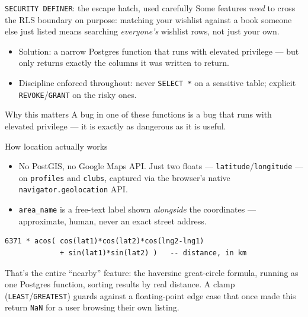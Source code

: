 \documentclass[aspectratio=169,11pt]{beamer}
\newcommand{\code}[1]{\textcolor{olkTealDark}{\texttt{#1}}}
\begin{document}
\begin{frame}[fragile]{\code{SECURITY DEFINER}: the escape hatch, used carefully}
  Some features \emph{need} to cross the RLS boundary on purpose: matching your wishlist against a book someone else just listed means searching \emph{everyone's} wishlist rows, not just your own.
  \begin{itemize}
    \item Solution: a narrow Postgres function that runs with elevated privilege --- but only returns exactly the columns it was written to return.
    \item Discipline enforced throughout: never \code{SELECT *} on a sensitive table; explicit \code{REVOKE}/\code{GRANT} on the risky ones.
  \end{itemize}
  \vfill
  \begin{alertblock}{Why this matters}
    A bug in one of these functions is a bug that runs with elevated privilege --- it is exactly as dangerous as it is useful.
  \end{alertblock}
\end{frame}

\begin{frame}[fragile]{How location actually works}
  \begin{itemize}
    \item No PostGIS, no Google Maps API. Just two floats --- \code{latitude}/\code{longitude} --- on \code{profiles} and \code{clubs}, captured via the browser's native \code{navigator.geolocation} API.
    \item \code{area\_name} is a free-text label shown \emph{alongside} the coordinates --- approximate, human, never an exact street address.
  \end{itemize}
  \begin{lstlisting}
6371 * acos( cos(lat1)*cos(lat2)*cos(lng2-lng1)
             + sin(lat1)*sin(lat2) )   -- distance, in km
  \end{lstlisting}
  \small That's the entire ``nearby'' feature: the haversine great-circle formula, running as one Postgres function, sorting results by real distance. A clamp (\code{LEAST}/\code{GREATEST}) guards against a floating-point edge case that once made this return \code{NaN} for a user browsing their own listing.
\end{frame}
\end{document}
